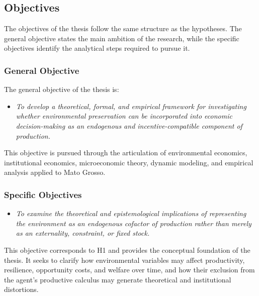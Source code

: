 \subsection{Objectives}

The objectives of the thesis follow the same structure as the hypotheses. The general objective states the main ambition of the research, while the specific objectives identify the analytical steps required to pursue it.

\subsubsection{General Objective}

The general objective of the thesis is:

\begin{itemize}

    \item[\textbf{G0.}]
    
    \textit{To develop a theoretical, formal, and empirical framework for investigating whether environmental preservation can be incorporated into economic decision-making as an endogenous and incentive-compatible component of production.}

\end{itemize}

This objective is pursued through the articulation of environmental economics, institutional economics, microeconomic theory, dynamic modeling, and empirical analysis applied to Mato Grosso.

\subsubsection{Specific Objectives}

\begin{itemize}

    \item[\textbf{G1.}]
    
    \textit{To examine the theoretical and epistemological implications of representing the environment as an endogenous cofactor of production rather than merely as an externality, constraint, or fixed stock.}

\end{itemize}

This objective corresponds to H1 and provides the conceptual foundation of the thesis. It seeks to clarify how environmental variables may affect productivity, resilience, opportunity costs, and welfare over time, and how their exclusion from the agent's productive calculus may generate theoretical and institutional distortions.

